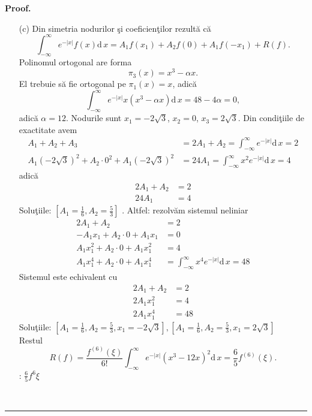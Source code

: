 \documentclass[12pt]{article}%
\newenvironment{proof}[1][Proof]{\noindent\textbf{#1.} }{\ \rule{0.5em}{0.5em}}
\begin{document}
\begin{proof}
\begin{enumerate}
\item[(c)] Din simetria nodurilor \c{s}i coeficien\c{t}ilor rezult\u{a} c\u{a}%
\[
\int_{-\infty}^{\infty}e^{-|x|}f(x)\mathrm{d}\,x=A_{1}f(x_{1})+A_{2}%
f(0)+A_{1}f(-x_{1})+R(f).
\]
Polinomul ortogonal are forma
\[
\pi_{3}(x)=x^{3}-\alpha x.
\]
El trebuie s\u{a} fie ortogonal pe $\pi_{1}(x)=x$, adic\u{a}%
\[
\int_{-\infty}^{\infty}e^{-\left\vert x\right\vert }x\left(  x^{3}-\alpha
x\right)  \mathrm{d}\,x=48-4\alpha=0,
\]
adic\u{a} $\alpha=12$. Nodurile sunt $x_{1}=-2\sqrt{3}$, $x_{2}=0$,
$x_{3}=2\sqrt{3}$. Din condi\c{t}iile de exactitate avem%
\begin{align*}
A_{1}+A_{2}+A_{3}  & =2A_{1}+A_{2}=\int_{-\infty}^{\infty}e^{-\left\vert
x\right\vert }\mathrm{d}\,x=2\\
A_{1}(-2\sqrt{3})^{2}+A_{2}\cdot0^{2}+A_{1}(-2\sqrt{3})^{2}  & =24A_{1}%
=\int_{-\infty}^{\infty}x^{2}e^{-\left\vert x\right\vert }\mathrm{d}\,x=4
\end{align*}
adic\u{a}%
\begin{align*}
2A_{1}+A_{2}  & =2\\
24A_{1}  & =4
\end{align*}
Solu\c{t}iile: $\left[  A_{1}=\frac{1}{6},A_{2}=\frac{5}{3}\right]  $ .
Altfel: rezolv\u{a}m sistemul neliniar%
\begin{align*}
2A_{1}+A_{2}  & =2\\
-A_{1}x_{1}+A_{2}\cdot0+A_{1}x_{1}  & =0\\
A_{1}x_{1}^{2}+A_{2}\cdot0+A_{1}x_{1}^{2}  & =4\\
A_{1}x_{1}^{4}+A_{2}\cdot0+A_{1}x_{1}^{4}  & =\int_{-\infty}^{\infty}%
x^{4}e^{-\left\vert x\right\vert }\mathrm{d}\,x=48
\end{align*}
Sistemul este echivalent cu%
\begin{align*}
2A_{1}+A_{2}  & =2\\
2A_{1}x_{1}^{2}  & =4\\
2A_{1}x_{1}^{4}  & =48
\end{align*}
Solu\c{t}iile: $\left[  A_{1}=\frac{1}{6},A_{2}=\frac{5}{3},x_{1}=-2\sqrt
{3}\right]  ,\left[  A_{1}=\frac{1}{6},A_{2}=\frac{5}{3},x_{1}=2\sqrt
{3}\right]  \allowbreak$\\ Restul%
\[
R(f)=\frac{f^{(6)}(\xi)}{6!}\int_{-\infty}^{\infty}e^{-\left\vert x\right\vert
}\left(  x^{3}-12x\right)  ^{2}\mathrm{d}\,x=\frac{6}{5}f^{(6)}(\xi).
\]
: $\frac{6}{5}f^{6}\xi$\newline\newline
\end{enumerate}
\end{proof}
\end{document}
